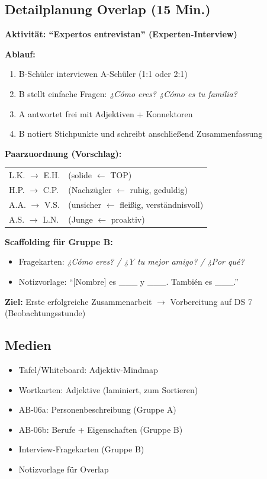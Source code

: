 \documentclass[11pt,a4paper]{article}
\begin{document}
\subsection{Detailplanung Overlap (15 Min.)}

\begin{overlapbox}
\textbf{Aktivität: ``Expertos entrevistan'' (Experten-Interview)}

\vspace{0.5em}
\textbf{Ablauf:}
\begin{enumerate}
    \item B-Schüler interviewen A-Schüler (1:1 oder 2:1)
    \item B stellt einfache Fragen: \textit{¿Cómo eres? ¿Cómo es tu familia?}
    \item A antwortet frei mit Adjektiven + Konnektoren
    \item B notiert Stichpunkte und schreibt anschließend Zusammenfassung
\end{enumerate}

\textbf{Paarzuordnung (Vorschlag):}
\begin{tabular}{ll}
\textcolor{gruppeB}{L.K.} $\rightarrow$ \textcolor{gruppeA}{E.H.} & (solide $\leftarrow$ TOP) \\
\textcolor{gruppeB}{H.P.} $\rightarrow$ \textcolor{gruppeA}{C.P.} & (Nachzügler $\leftarrow$ ruhig, geduldig) \\
\textcolor{gruppeB}{A.A.} $\rightarrow$ \textcolor{gruppeA}{V.S.} & (unsicher $\leftarrow$ fleißig, verständnisvoll) \\
\textcolor{gruppeB}{A.S.} $\rightarrow$ \textcolor{gruppeA}{L.N.} & (Junge $\leftarrow$ proaktiv) \\
\end{tabular}

\vspace{0.5em}
\textbf{Scaffolding für Gruppe B:}
\begin{itemize}
    \item Fragekarten: \textit{¿Cómo eres? / ¿Y tu mejor amigo? / ¿Por qué?}
    \item Notizvorlage: ``[Nombre] es \_\_\_ y \_\_\_. También es \_\_\_.''
\end{itemize}

\textbf{Ziel:} Erste erfolgreiche Zusammenarbeit $\rightarrow$ Vorbereitung auf DS 7 (Beobachtungsstunde)
\end{overlapbox}

\subsection{Medien}
\begin{itemize}
    \item Tafel/Whiteboard: Adjektiv-Mindmap
    \item Wortkarten: Adjektive (laminiert, zum Sortieren)
    \item AB-06a: Personenbeschreibung (Gruppe A)
    \item AB-06b: Berufe + Eigenschaften (Gruppe B)
    \item Interview-Fragekarten (Gruppe B)
    \item Notizvorlage für Overlap
\end{itemize}
\end{document}
